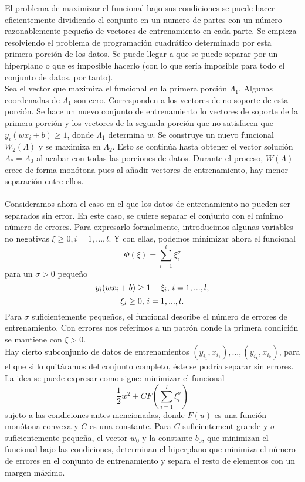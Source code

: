 El problema de maximizar el funcional bajo sus condiciones se puede hacer eficientemente dividiendo el conjunto en un numero de partes con un número razonablemente pequeño de vectores de entrenamiento en cada parte. Se empieza resolviendo el problema de programación cuadrático determinado por esta primera porción de los datos. Se puede llegar a que se puede separar por un hiperplano o que es imposible hacerlo (con lo que sería imposible para todo el conjunto de datos, por tanto).\\
Sea el vector que maximiza el funcional en la primera porción $\Lambda_1$. Algunas coordenadas de $\Lambda_1$ son cero. Corresponden a los vectores de no-soporte de esta porción. Se hace un nuevo conjunto de entrenamiento lo vectores de soporte de la primera porción y los vectores de la segunda porción que no satisfacen que $y_i(wx_i+b) \geq 1$, donde $\Lambda_1$ determina $w$. Se construye un nuevo funcional $W_2(\Lambda)$ y se maximiza en $\Lambda_2$. Esto se continúa hasta obtener el vector solución $\Lambda_*=\Lambda_0$ al acabar con todas las porciones de datos. Durante el proceso, $W(\Lambda)$ crece de forma monótona pues al añadir vectores de entrenamiento, hay menor separación entre ellos.\cite{cortes1995support}\\\\
Consideramos ahora el caso en el que los datos de entrenamiento no pueden ser separados sin error. En este caso, se quiere separar el conjunto con el mínimo número de errores. Para expresarlo formalmente, introducimos algunas variables no negativas $\xi \geq 0, i=1,...,l$. Y con ellas, podemos minimizar ahora el funcional
\[ \Phi(\xi)=\sum_{i=1}^l \xi_i^{\sigma} \]
para un $\sigma >0$ pequeño 
\[ y_i(wx_i+b) \geq 1-\xi_i \textnormal{, } i=1,...,l, \]
\[ \xi_i \geq 0 \textnormal{, } i=1,...,l. \]
Para $\sigma$ suficientemente pequeños, el funcional describe el número de errores de entrenamiento. Con errores nos referimos a un patrón donde la primera condición se mantiene con $\xi>0$.\\
Hay cierto subconjunto de datos de entrenamientos $(y_{i_1}, x_{i_1}),...,(y_{i_k},x_{i_k})$, para el que si lo quitáramos del conjunto completo, éste se podría separar sin errores.\\
La idea se puede expresar como sigue: minimizar el funcional
\[ \frac{1}{2}w^2+CF \left( \sum_{i=1}^l \xi_i^{\sigma} \right) \]
sujeto a las condiciones antes mencionadas, donde $F(u)$ es una función monótona convexa y $C$ es una constante. Para $C$ suficientement grande y $\sigma$ suficientemente pequeña, el vector $w_0$ y la constante $b_0$, que minimizan el funcional bajo las condiciones, determinan el hiperplano que minimiza el número de errores en el conjunto de entrenamiento y separa el resto de elementos con un margen máximo.\\
